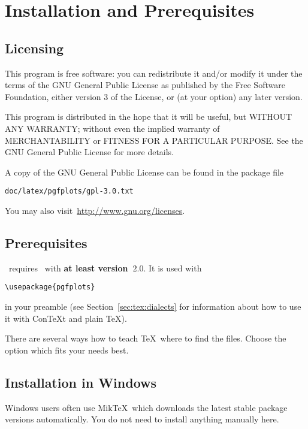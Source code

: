 
\section{Installation and Prerequisites}
\subsection{Licensing}
This program is free software: you can redistribute it and/or modify
it under the terms of the GNU General Public License as published by
the Free Software Foundation, either version 3 of the License, or
(at your option) any later version.

This program is distributed in the hope that it will be useful,
but WITHOUT ANY WARRANTY; without even the implied warranty of
MERCHANTABILITY or FITNESS FOR A PARTICULAR PURPOSE.  See the
GNU General Public License for more details.

A copy of the GNU General Public License can be found in the package file
\begin{verbatim}
doc/latex/pgfplots/gpl-3.0.txt
\end{verbatim}
You may also visit~\url{http://www.gnu.org/licenses}.

\subsection{Prerequisites}
\PGFPlots\ requires \PGF\ with \textbf{at least version~$2.0$}. It is used with
\begin{verbatim}
\usepackage{pgfplots}
\end{verbatim}
in your preamble (see Section~\ref{sec:tex:dialects} for information about how to use it with Con{\TeX}t and plain \TeX).


There are several ways how to teach \TeX\ where to find the files. Choose the option which fits your needs best.

\subsection{Installation in Windows}
Windows users often use Mik\TeX\ which downloads the latest stable package versions automatically. You do not need to install anything manually here. 

